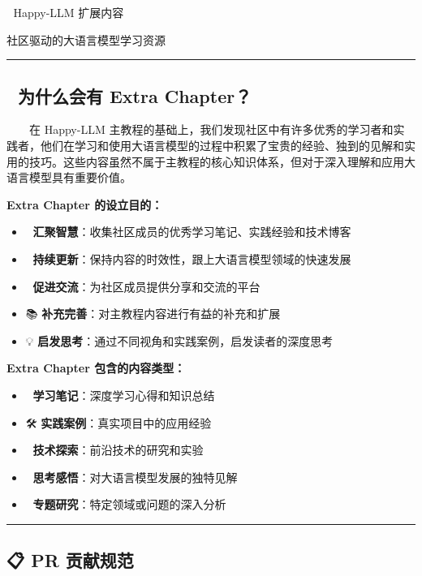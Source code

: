 \documentclass[
]{article}
\author{}
\date{}
\providecommand{\tightlist}{%
  \setlength{\itemsep}{0pt}\setlength{\parskip}{0pt}}
\begin{document}
{
\setcounter{tocdepth}{3}
\tableofcontents
}
🚀 Happy-LLM 扩展内容

社区驱动的大语言模型学习资源

\begin{center}\rule{0.5\linewidth}{0.5pt}\end{center}

\subsection{📖 为什么会有 Extra
Chapter？}\label{ux4e3aux4ec0ux4e48ux4f1aux6709-extra-chapter}

  在 Happy-LLM
主教程的基础上，我们发现社区中有许多优秀的学习者和实践者，他们在学习和使用大语言模型的过程中积累了宝贵的经验、独到的见解和实用的技巧。这些内容虽然不属于主教程的核心知识体系，但对于深入理解和应用大语言模型具有重要价值。

\textbf{Extra Chapter 的设立目的：}

\begin{itemize}
\tightlist
\item
  🌟 \textbf{汇聚智慧}：收集社区成员的优秀学习笔记、实践经验和技术博客
\item
  🔄 \textbf{持续更新}：保持内容的时效性，跟上大语言模型领域的快速发展
\item
  🤝 \textbf{促进交流}：为社区成员提供分享和交流的平台
\item
  📚 \textbf{补充完善}：对主教程内容进行有益的补充和扩展
\item
  💡 \textbf{启发思考}：通过不同视角和实践案例，启发读者的深度思考
\end{itemize}

\textbf{Extra Chapter 包含的内容类型：}

\begin{itemize}
\tightlist
\item
  📝 \textbf{学习笔记}：深度学习心得和知识总结
\item
  🛠️ \textbf{实践案例}：真实项目中的应用经验
\item
  🔬 \textbf{技术探索}：前沿技术的研究和实验
\item
  💭 \textbf{思考感悟}：对大语言模型发展的独特见解
\item
  🎯 \textbf{专题研究}：特定领域或问题的深入分析
\end{itemize}

\begin{center}\rule{0.5\linewidth}{0.5pt}\end{center}

\subsection{📋 PR 贡献规范}\label{pr-ux8d21ux732eux89c4ux8303}
\end{document}
